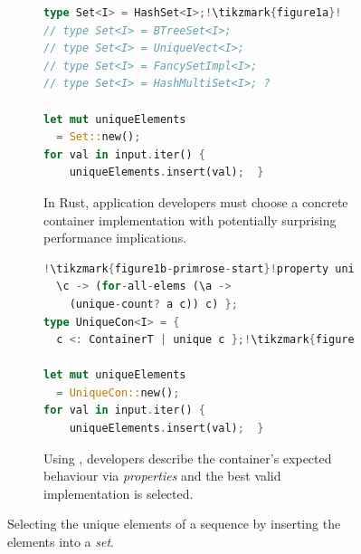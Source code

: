 \begin{figure}[t]
    \centering
    \begin{subfigure}[t]{0.48\textwidth}
        \centering
\begin{lstlisting}[language=Rust, style=boxed, basicstyle=\footnotesize\ttfamily,escapechar=!]
type Set<I> = HashSet<I>;!\tikzmark{figure1a}!
// type Set<I> = BTreeSet<I>;
// type Set<I> = UniqueVect<I>;
// type Set<I> = FancySetImpl<I>;
// type Set<I> = HashMultiSet<I>; ?

let mut uniqueElements 
  = Set::new();
for val in input.iter() {
    uniqueElements.insert(val);  }
\end{lstlisting}
        \caption{In Rust, application developers must choose a concrete container implementation with potentially surprising performance implications.}
        \label{fig:motivating_example:rust}
    \end{subfigure}
    \hfill
    \begin{subfigure}[t]{0.48\textwidth}
        \centering
\begin{lstlisting}[language=Rust, style=boxed, basicstyle=\footnotesize\ttfamily]
!\tikzmark{figure1b-primrose-start}!property unique {
  \c -> (for-all-elems (\a ->
    (unique-count? a c)) c) };
type UniqueCon<I> = {
  c <: ContainerT | unique c };!\tikzmark{figure1b-primrose-end}!

let mut uniqueElements
  = UniqueCon::new();
for val in input.iter() {
    uniqueElements.insert(val);  }
\end{lstlisting}
        \caption{Using \Primrose{}, developers describe the container's expected behaviour via \emph{properties} and the best valid implementation is selected.}
        \label{fig:motivating_example:primrose}
    \end{subfigure}
    \vspace{1em}
    \caption{Selecting the unique elements of a sequence by inserting the elements into a \emph{set}.}
    \label{fig:motivating_example}
\end{figure}



